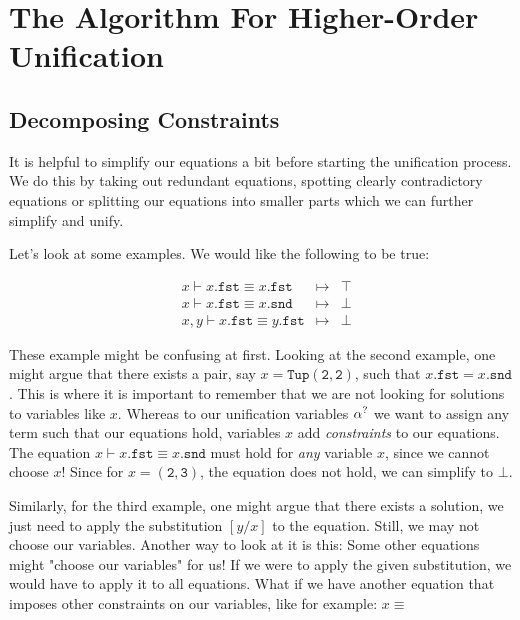 \documentclass[twoside,12pt,a4paper]{article}
\begin{document}
\section{The Algorithm For Higher-Order Unification}

\subsection{Decomposing Constraints}

It is helpful to simplify our equations a bit before starting the unification process.
We do this by taking out redundant equations, spotting clearly contradictory equations or splitting our equations into smaller parts which we can further simplify and unify.

Let's look at some examples. We would like the following to be true:
\begin{example}
    \begin{align*}
    &x \vdash x.\mathtt{fst} \equiv x.\mathtt{fst} &\mapsto& \top
    \\
    &x \vdash x.\mathtt{fst} \equiv x.\mathtt{snd} &\mapsto& \bot 
    \\
    &x,y \vdash x.\mathtt{fst} \equiv y.\mathtt{fst} &\mapsto& \bot 
    \end{align*}
\end{example}
These example might be confusing at first. Looking at the second example, one might argue that there exists a pair, say $x = \mathtt{Tup(2,2)}$, such that
$x.\mathtt{fst} = x.\mathtt{snd}$. This is where it is important to remember that we are not looking for solutions to variables like $x$.
Whereas to our unification variables $\alpha^?$ we want to assign any term such that our equations hold, variables $x$ add \textit{constraints} to our equations. 
The equation $x \vdash x.\mathtt{fst} \equiv x.\mathtt{snd}$ must hold for \textit{any} variable $x$, since we cannot choose $x$! 
Since for $x = \mathtt{(2,3)}$, the equation does not hold, we can simplify to $\bot$.

Similarly, for the third example, one might argue that there exists a solution, we just need to apply the substitution $[y/x]$ to the equation. 
Still, we may not choose our variables. Another way to look at it is this: Some other equations might "choose our variables" for us!
If we were to apply the given substitution, we would have to apply it to all equations. What if we have another equation 
that imposes other constraints on our variables, like for example: 
$x \equiv $ %
\end{document}
